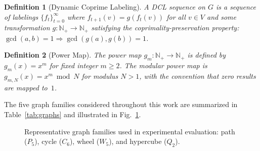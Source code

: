 \documentclass[lettersize,journal]{IEEEtran}
\newtheorem{definition}{Definition}
\begin{document}
\begin{definition}[Dynamic Coprime Labeling]
A \emph{DCL sequence} on $G$ is a sequence of labelings $\{f_t\}_{t=0}^{\infty}$ where $f_{t+1}(v) = g(f_t(v))$ for all $v \in V$ and some transformation $g: \mathbb{N}_+ \to \mathbb{N}_+$ satisfying the coprimality-preservation property: $\gcd(a,b) = 1 \Rightarrow \gcd(g(a), g(b)) = 1$.
\end{definition}

\begin{definition}[Power Map]
The \emph{power map} $g_m: \mathbb{N}_+ \to \mathbb{N}_+$ is defined by $g_m(x) = x^m$ for fixed integer $m \geq 2$. The \emph{modular power map} is $g_{m,N}(x) = x^m \bmod N$ for modulus $N > 1$, with the convention that zero results are mapped to~$1$.
\end{definition}

\noindent The five graph families considered throughout this work are summarized in Table~\ref{tab:graphs} and illustrated in Fig.~\ref{fig:graphs}.

\begin{figure}[!t]
\centering
{}
\caption{Representative graph families used in experimental evaluation: path ($P_5$), cycle ($C_6$), wheel ($W_5$), and hypercube ($Q_2$).}
\label{fig:graphs}
\end{figure}
\end{document}
